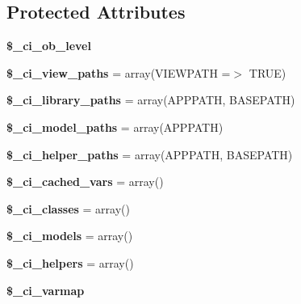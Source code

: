 \subsection*{Protected Attributes}
\begin{DoxyCompactItemize}
\item 
\mbox{\label{class_c_i___loader_a6108da89310125a35cb1054ebbb867e2}} 
{\bfseries \$\+\_\+ci\+\_\+ob\+\_\+level}
\item 
\mbox{\label{class_c_i___loader_a978816535be1594ab371b3b5d82f7439}} 
{\bfseries \$\+\_\+ci\+\_\+view\+\_\+paths} = array(V\+I\+E\+W\+P\+A\+TH =$>$ T\+R\+UE)
\item 
\mbox{\label{class_c_i___loader_a504cc3adce8f3e6f914e0dcaba26d061}} 
{\bfseries \$\+\_\+ci\+\_\+library\+\_\+paths} = array(A\+P\+P\+P\+A\+TH, B\+A\+S\+E\+P\+A\+TH)
\item 
\mbox{\label{class_c_i___loader_aa07f3254f87e4300c2b5674dbc408aae}} 
{\bfseries \$\+\_\+ci\+\_\+model\+\_\+paths} = array(A\+P\+P\+P\+A\+TH)
\item 
\mbox{\label{class_c_i___loader_a197755942d483baa59972d60847012fa}} 
{\bfseries \$\+\_\+ci\+\_\+helper\+\_\+paths} = array(A\+P\+P\+P\+A\+TH, B\+A\+S\+E\+P\+A\+TH)
\item 
\mbox{\label{class_c_i___loader_a206eecf62ddf4dabc4f0ebb23a9e36b3}} 
{\bfseries \$\+\_\+ci\+\_\+cached\+\_\+vars} = array()
\item 
\mbox{\label{class_c_i___loader_a9130099fe80be5a766bcaca1576cb1ab}} 
{\bfseries \$\+\_\+ci\+\_\+classes} = array()
\item 
\mbox{\label{class_c_i___loader_a9cf408036675e0e5f5fe6093c468582a}} 
{\bfseries \$\+\_\+ci\+\_\+models} = array()
\item 
\mbox{\label{class_c_i___loader_a7d90cfd7cbecfc93258077751b0dbf3c}} 
{\bfseries \$\+\_\+ci\+\_\+helpers} = array()
\item 
{\bfseries \$\+\_\+ci\+\_\+varmap}
\end{DoxyCompactItemize}


